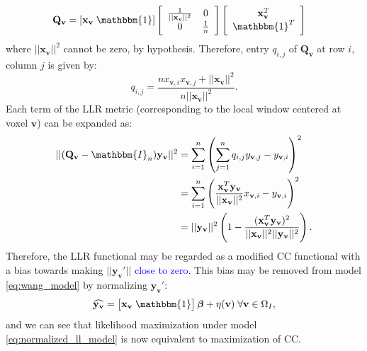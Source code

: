 \begin{align*}
    \mathbf{Q}_{\mathbf{v}} &= [\mathbf{x}_{\mathbf{v}} \; \mathbbm{1}]
    \left[\begin{array}{cc}
        \frac{1}{||\mathbf{x}_{\mathbf{v}}||^{2}} & 0\\
        0 & \frac{1}{n}
    \end{array}\right]
    \left[\begin{array}{c}
        \mathbf{x}_{\mathbf{v}}^{T}\\
        \mathbbm{1}^{T}
    \end{array}\right]
\end{align*}
where $||\mathbf{x}_{\mathbf{v}}||^{2}$ cannot be zero, by hypothesis. Therefore, entry $q_{i,j}$ of $\mathbf{Q}_{\mathbf{v}}$ at row $i$, column $j$ is given by:
\vspace{-0.3cm}
\begin{displaymath}
    q_{i,j} = \frac{nx_{\mathbf{v},i}x_{\mathbf{v}, j} + ||\mathbf{x}_{\mathbf{v}}||^{2}}{n||\mathbf{x}_{\mathbf{v}}||^{2}}.
\end{displaymath}
Each term of the LLR metric (corresponding to the local window centered at voxel $\mathbf{v}$) can be expanded as:
\begin{equation}\label{eq:llr_cc_relationship}
    \begin{split}
        ||(\mathbf{Q}_{\mathbf{v}} - \mathbbm{I}_{n})\mathbf{y}_{\mathbf{v}}||^{2} &= \sum_{i=1}^{n} \left(\sum_{j=1}^{n} q_{i,j} y_{\mathbf{v}, j} - y_{\mathbf{v},i}\right)^{2}\\
        &=\sum_{i=1}^{n}\left(\frac{\mathbf{x}_{\mathbf{v}}^{T}\mathbf{y}_{\mathbf{v}}}{||\mathbf{x}_{\mathbf{v}}||^{2}} x_{\mathbf{v}, i} - y_{\mathbf{v},i}\right)^{2} \\
        &= ||\mathbf{y}_{\mathbf{v}}||^{2}\left(1 - \frac{(\mathbf{x}_{\mathbf{v}}^{T}\mathbf{y}_{\mathbf{v}})^{2}}{||\mathbf{x}_{\mathbf{v}}||^{2}||\mathbf{y}_{\mathbf{v}}||^{2}}\right).
    \end{split}
\end{equation}
Therefore, the LLR functional may be regarded as a modified CC functional with a bias towards making $||\mathbf{y}_{\mathbf{v}}'||$ \textcolor{blue}{close to zero}. This bias may be removed from model \eqref{eq:wang_model} by normalizing $\mathbf{y}_{\mathbf{v}}'$:\\
\begin{equation}\label{eq:normalized_ll_model}
    \widehat{\mathbf{y}_{\mathbf{v}}} = \left[\mathbf{x}_{\mathbf{v}} \; \mathbbm{1}\right]\boldsymbol{\beta} + \eta(\mathbf{v}) \; \forall \mathbf{v}\in\Omega_{I},
\end{equation}
and we can see that likelihood maximization under model \eqref{eq:normalized_ll_model} is now equivalent to maximization of CC.\\

